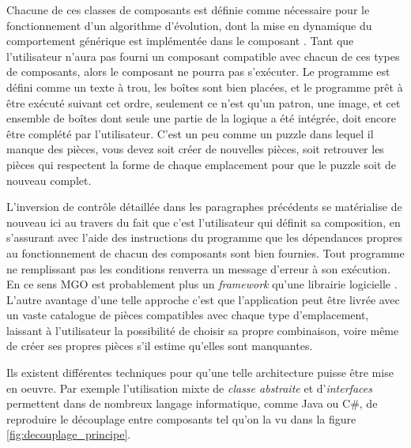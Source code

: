 Chacune de ces classes de composants est définie comme nécessaire pour le fonctionnement d'un algorithme d'évolution, dont la mise en dynamique du comportement générique est implémentée dans le composant . Tant que l'utilisateur n'aura pas fourni un composant compatible avec chacun de ces types de composants, alors le composant  ne pourra pas s'exécuter. Le programme est défini comme un texte à trou, les boîtes sont bien placées, et le programme prêt à être exécuté suivant cet ordre, seulement ce n'est qu'un patron, une image, et cet ensemble de boîtes dont seule une partie de la logique a été intégrée, doit encore être complété par l'utilisateur. C'est un peu comme un puzzle dans lequel il manque des pièces, vous devez soit créer de nouvelles pièces, soit retrouver les pièces qui respectent la forme de chaque emplacement pour que le puzzle soit de nouveau complet.

L'inversion de contrôle détaillée dans les paragraphes précédents se matérialise de nouveau ici au travers du fait que c'est l'utilisateur qui définit sa composition, en s'assurant avec l'aide des instructions du programme que les dépendances propres au fonctionnement de chacun des composants sont bien fournies. Tout programme ne remplissant pas les conditions renverra un message d'erreur à son exécution. En ce sens MGO est probablement plus un \textit{\textit{framework}} qu'une librairie logicielle . L'autre avantage d'une telle approche c'est que l'application peut être livrée avec un vaste catalogue de pièces compatibles avec chaque type d'emplacement, laissant à l'utilisateur la possibilité de choisir sa propre combinaison, voire même de créer ses propres pièces s'il estime qu'elles sont manquantes.

Ils existent différentes techniques pour qu'une telle architecture puisse être mise en oeuvre. Par exemple l'utilisation mixte de \textit{classe abstraite} et d'\textit{interfaces} permettent dans de nombreux langage informatique, comme Java ou C\#, de reproduire le découplage entre composants tel qu'on la vu dans la figure \ref{fig:decouplage_principe}.

